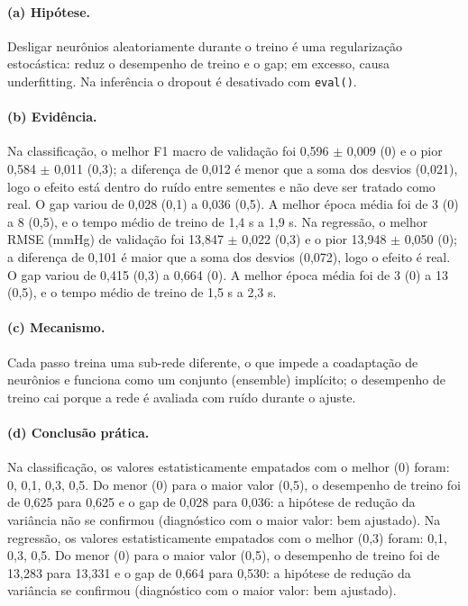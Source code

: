 \documentclass[11pt,a4paper]{article}
\begin{document}
\paragraph{(a) Hipótese.} Desligar neurônios aleatoriamente durante o treino é uma regularização estocástica: reduz o desempenho de treino e o gap; em excesso, causa underfitting. Na inferência o dropout é desativado com \texttt{eval()}.

\paragraph{(b) Evidência.} Na classificação, o melhor F1 macro de validação foi 0,596 $\pm$ 0,009 (0) e o pior 0,584 $\pm$ 0,011 (0,3); a diferença de 0,012 é menor que a soma dos desvios (0,021), logo o efeito está dentro do ruído entre sementes e não deve ser tratado como real. O gap variou de 0,028 (0,1) a 0,036 (0,5). A melhor época média foi de 3 (0) a 8 (0,5), e o tempo médio de treino de 1,4 s a 1,9 s. Na regressão, o melhor RMSE (mmHg) de validação foi 13,847 $\pm$ 0,022 (0,3) e o pior 13,948 $\pm$ 0,050 (0); a diferença de 0,101 é maior que a soma dos desvios (0,072), logo o efeito é real. O gap variou de 0,415 (0,3) a 0,664 (0). A melhor época média foi de 3 (0) a 13 (0,5), e o tempo médio de treino de 1,5 s a 2,3 s.

\paragraph{(c) Mecanismo.} Cada passo treina uma sub-rede diferente, o que impede a coadaptação de neurônios e funciona como um conjunto (ensemble) implícito; o desempenho de treino cai porque a rede é avaliada com ruído durante o ajuste.

\paragraph{(d) Conclusão prática.} Na classificação, os valores estatisticamente empatados com o melhor (0) foram: 0, 0,1, 0,3, 0,5. Do menor (0) para o maior valor (0,5), o desempenho de treino foi de 0,625 para 0,625 e o gap de 0,028 para 0,036: a hipótese de redução da variância não se confirmou (diagnóstico com o maior valor: bem ajustado). Na regressão, os valores estatisticamente empatados com o melhor (0,3) foram: 0,1, 0,3, 0,5. Do menor (0) para o maior valor (0,5), o desempenho de treino foi de 13,283 para 13,331 e o gap de 0,664 para 0,530: a hipótese de redução da variância se confirmou (diagnóstico com o maior valor: bem ajustado).
\end{document}
